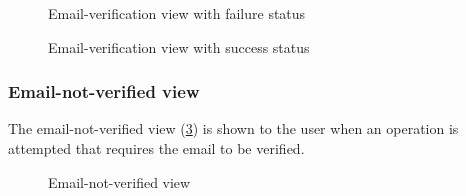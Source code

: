 \begin{figure}
    \centering

    \caption{Email-verification view with failure status}
    \label{fig:web-email-verification-error}
\end{figure}
\begin{figure}
    \centering


    \caption{Email-verification view with success status}
    \label{fig:web-email-verification-success}
\end{figure}

\subsubsection{Email-not-verified view}
The email-not-verified view (\ref{fig:web-email-not-verified}) is shown to the user when an operation is attempted that requires the email to be verified.

\begin{figure}
    \centering

    \caption{Email-not-verified view}
    \label{fig:web-email-not-verified}
\end{figure}
